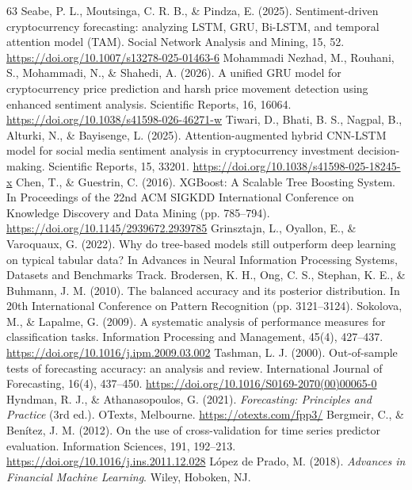 \begin{thebibliography}{63}
     Seabe, P. L., Moutsinga, C. R. B., \& Pindza, E. (2025). Sentiment-driven cryptocurrency forecasting: analyzing LSTM, GRU, Bi-LSTM, and temporal attention model (TAM). Social Network Analysis and Mining, 15, 52. \url{https://doi.org/10.1007/s13278-025-01463-6}
     Mohammadi Nezhad, M., Rouhani, S., Mohammadi, N., \& Shahedi, A. (2026). A unified GRU model for cryptocurrency price prediction and harsh price movement detection using enhanced sentiment analysis. Scientific Reports, 16, 16064. \url{https://doi.org/10.1038/s41598-026-46271-w}
     Tiwari, D., Bhati, B. S., Nagpal, B., Alturki, N., \& Bayisenge, L. (2025). Attention-augmented hybrid CNN-LSTM model for social media sentiment analysis in cryptocurrency investment decision-making. Scientific Reports, 15, 33201. \url{https://doi.org/10.1038/s41598-025-18245-x}
     Chen, T., \& Guestrin, C. (2016). XGBoost: A Scalable Tree Boosting System. In Proceedings of the 22nd ACM SIGKDD International Conference on Knowledge Discovery and Data Mining (pp. 785--794). \url{https://doi.org/10.1145/2939672.2939785}
     Grinsztajn, L., Oyallon, E., \& Varoquaux, G. (2022). Why do tree-based models still outperform deep learning on typical tabular data? In Advances in Neural Information Processing Systems, Datasets and Benchmarks Track.
     Brodersen, K. H., Ong, C. S., Stephan, K. E., \& Buhmann, J. M. (2010). The balanced accuracy and its posterior distribution. In 20th International Conference on Pattern Recognition (pp. 3121--3124).
     Sokolova, M., \& Lapalme, G. (2009). A systematic analysis of performance measures for classification tasks. Information Processing and Management, 45(4), 427--437. \url{https://doi.org/10.1016/j.ipm.2009.03.002}
     Tashman, L. J. (2000). Out-of-sample tests of forecasting accuracy: an analysis and review. International Journal of Forecasting, 16(4), 437--450. \url{https://doi.org/10.1016/S0169-2070(00)00065-0}
     Hyndman, R. J., \& Athanasopoulos, G. (2021). \emph{Forecasting: Principles and Practice} (3rd ed.). OTexts, Melbourne. \url{https://otexts.com/fpp3/}
     Bergmeir, C., \& Ben{\'i}tez, J. M. (2012). On the use of cross-validation for time series predictor evaluation. Information Sciences, 191, 192--213. \url{https://doi.org/10.1016/j.ins.2011.12.028}
     L{\'o}pez de Prado, M. (2018). \emph{Advances in Financial Machine Learning}. Wiley, Hoboken, NJ.

\end{thebibliography}
